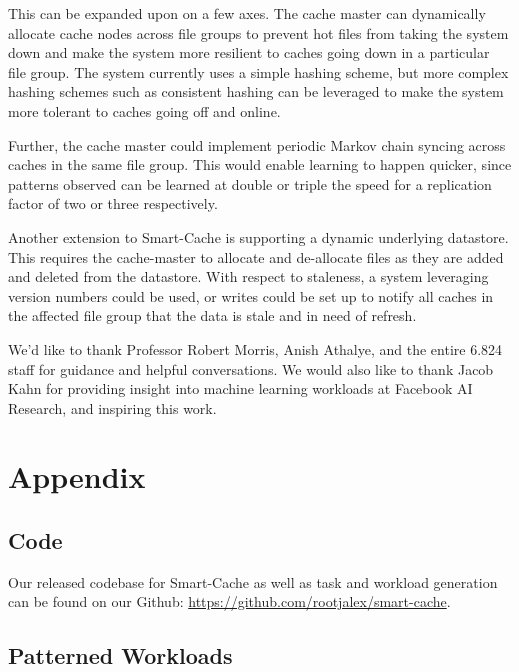 \documentclass[sigconf]{acmart}
\begin{document}
This can be expanded upon on a few axes. The cache master can dynamically allocate cache nodes across file groups to prevent hot files from taking the system down and make the system more resilient to caches going down in a particular file group. The system currently uses a simple hashing scheme, but more complex hashing schemes such as consistent hashing \cite{ConsistentHash} can be leveraged to make the system more tolerant to caches going off and online.

Further, the cache master could implement periodic Markov chain syncing across caches in the same file group. This would enable learning to happen quicker, since patterns observed can be learned at double or triple the speed for a replication factor of two or three respectively. 

Another extension to Smart-Cache is supporting a dynamic underlying datastore. This requires the cache-master to allocate and de-allocate files as they are added and deleted from the datastore. With respect to staleness, a system leveraging version numbers could be used, or writes could be set up to notify all caches in the affected file group that the data is stale and in need of refresh.




\begin{acks}
We'd like to thank Professor Robert Morris, Anish Athalye, and the entire 6.824 staff for guidance and helpful conversations. We would also like to thank Jacob Kahn for providing insight into machine learning workloads at Facebook AI Research, and inspiring this work.
\end{acks}


\appendix
\section{Appendix}
\label{sec:appendix}

\subsection{Code}
\label{sec:code}
Our released codebase for Smart-Cache as well as task and workload generation can be found on our Github: \url{https://github.com/rootjalex/smart-cache}.

\subsection{Patterned Workloads}
\label{sec:patternedworkloads}
\end{document}
